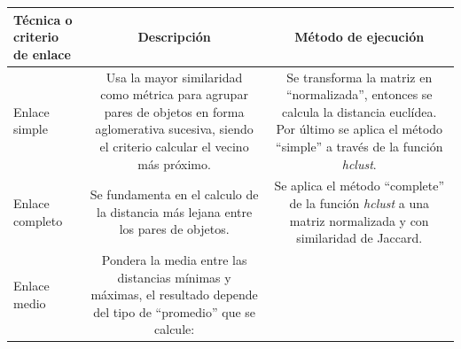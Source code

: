 \documentclass[11pt,]{article}
\begin{document}
\begin{longtable}[]{@{}lcc@{}}
\toprule
\begin{minipage}[b]{0.06\columnwidth}\raggedright\strut
Técnica o criterio de enlace\strut
\end{minipage} & \begin{minipage}[b]{0.58\columnwidth}\centering\strut
Descripción\strut
\end{minipage} & \begin{minipage}[b]{0.27\columnwidth}\centering\strut
Método de ejecución\strut
\end{minipage}\tabularnewline
\midrule
\endhead
\begin{minipage}[t]{0.06\columnwidth}\raggedright\strut
Enlace simple\strut
\end{minipage} & \begin{minipage}[t]{0.58\columnwidth}\centering\strut
Usa la mayor similaridad como métrica para agrupar pares de objetos en
forma aglomerativa sucesiva, siendo el criterio calcular el vecino más
próximo.\strut
\end{minipage} & \begin{minipage}[t]{0.27\columnwidth}\centering\strut
Se transforma la matriz en ``normalizada'', entonces se calcula la
distancia euclídea. Por último se aplica el método ``simple'' a través
de la función \emph{hclust}.\strut
\end{minipage}\tabularnewline
\begin{minipage}[t]{0.06\columnwidth}\raggedright\strut
Enlace completo\strut
\end{minipage} & \begin{minipage}[t]{0.58\columnwidth}\centering\strut
Se fundamenta en el calculo de la distancia más lejana entre los pares
de objetos.\strut
\end{minipage} & \begin{minipage}[t]{0.27\columnwidth}\centering\strut
Se aplica el método ``complete'' de la función \emph{hclust} a una
matriz normalizada y con similaridad de Jaccard.\strut
\end{minipage}\tabularnewline
\begin{minipage}[t]{0.06\columnwidth}\raggedright\strut
Enlace medio\strut
\end{minipage} & \begin{minipage}[t]{0.58\columnwidth}\centering\strut
Pondera la media entre las distancias mínimas y máximas, el resultado
depende del tipo de ``promedio'' que se calcule:\strut
\end{minipage}\tabularnewline
\bottomrule
\end{longtable}
\end{document}
